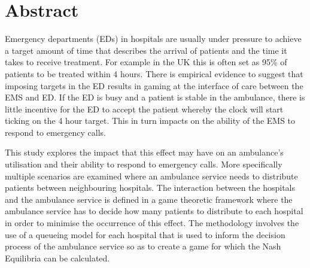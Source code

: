 \section{Abstract}
Emergency departments (EDs) in hospitals are usually under pressure to achieve a 
target amount of time that describes the arrival of patients and the time it takes 
to receive treatment. 
For example in the UK this is often set as 95\% of patients to be treated within 
4 hours. 
There is empirical evidence to suggest that imposing targets in the ED results in 
gaming at the interface of care between the EMS and ED. 
If the ED is busy and a patient is stable in the ambulance, there is little 
incentive for the ED to accept the patient whereby the clock will start ticking 
on the 4 hour target. 
This in turn impacts on the ability of the EMS to respond to emergency calls.

This study explores the impact that this effect may have on an ambulance's 
utilisation and their ability to respond to emergency calls. 
More specifically multiple scenarios are examined where an ambulance service needs 
to distribute patients between neighbouring hospitals. 
The interaction between the hospitals and the ambulance service is defined in a 
game theoretic framework where the ambulance service has to decide how many patients 
to distribute to each hospital in order to minimise the occurrence of this effect. 
The methodology involves the use of a queueing model for each hospital that is used 
to inform the decision process of the ambulance service so as to create a game for 
which the Nash Equilibria can be calculated.
